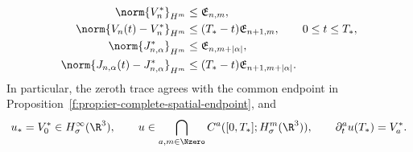 \begin{theorem}
\begin{align}
 \norm{V_n^*}_{H^m}
 &\le\mathfrak E_{n,m},
 \label{f:eq:ier-endpoint-velocity-size}\\
 \norm{V_n(t)-V_n^*}_{H^m}
 &\le(T_*-t)\mathfrak E_{n+1,m},
 \qquad0\le t\le T_*,
 \label{f:eq:ier-endpoint-velocity-modulus}\\
 \norm{J_{n,\alpha}^*}_{H^m}
 &\le\mathfrak E_{n,m+|\alpha|},
 \label{f:eq:ier-endpoint-mixed-size}\\
 \norm{J_{n,\alpha}(t)-J_{n,\alpha}^*}_{H^m}
 &\le(T_*-t)\mathfrak E_{n+1,m+|\alpha|}.
 \label{f:eq:ier-endpoint-mixed-modulus}
\end{align}
 In particular, the zeroth trace agrees with the common endpoint in
 Proposition~\ref{f:prop:ier-complete-spatial-endpoint}, and
\begin{equation}
 u_*=V_0^*\in H^\infty_\sigma(\R^3),
 \qquad
 u\in\bigcap_{a,m\in\Nzero}C^a([0,T_*];H^m_\sigma(\R^3)),
 \qquad
 \partial_t^au(T_*)=V_a^*.
 \label{f:eq:ier-complete-left-velocity-jet}
\end{equation}
\end{theorem}

